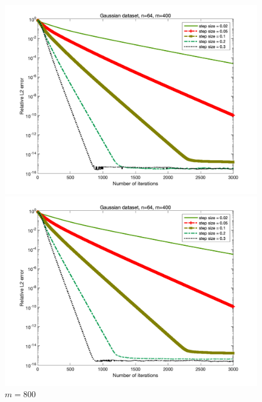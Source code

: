 \documentclass{article}
\begin{document}
	\begin{figure}
		\begin{minipage}{0.33\linewidth}
			\centering
			\includegraphics[width=1\linewidth]{./fig/gaussian+11.png}
			\caption{$m=400$}
		\end{minipage}
		\begin{minipage}{0.33\linewidth}
			\centering
			\includegraphics[width=1\linewidth]{./fig/gaussian+12.png}
			\caption{$m=800$}
		\end{minipage}
		\begin{minipage}{0.33\linewidth}
			\centering

\end{minipage}
\end{figure}
\end{document}
